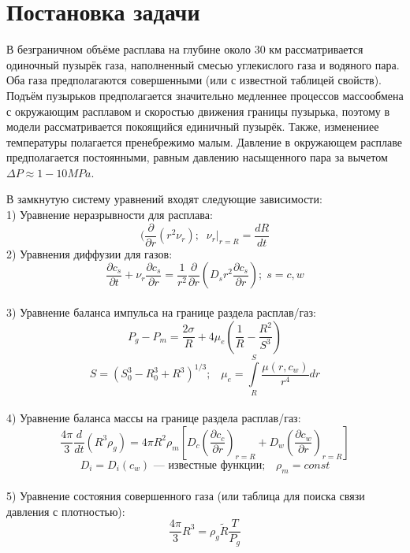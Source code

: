 \section{Постановка задачи}
\par В безграничном объёме расплава на глубине около 30 км рассматривается одиночный пузырёк газа, наполненный смесью углекислого газа и водяного пара. Оба газа предполагаются совершенными (или с известной таблицей свойств). Подъём пузырьков предполагается значительно медленнее процессов массообмена с окружающим расплавом и скоростью движения границы пузырька, поэтому в модели рассматривается покоящийся единичный пузырёк. Также, изменениее температуры полагается пренебрежимо малым. Давление в окружающем расплаве предполагается постоянными, равным давлению насыщенного пара за вычетом $\Delta P\approx 1-10 MPa$.\\
\par В замкнутую систему уравнений входят следующие зависимости:\\
1) Уравнение неразрывности для расплава:\\
$$(\frac{\partial}{\partial r}\left(r^{2}\nu_{r}\right);\;\; \left.\nu_{r}\right|_{r=R}=\frac{dR}{dt}$$
2) Уравнения диффузии для газов:\\
$$\frac{\partial c_{s}}{\partial t}+\nu_{r} \frac{\partial c_{s}}{\partial r}=\frac{1}{r^{2}}\frac{\partial}{\partial r}(D_{s}r^{2}\frac{\partial c_{s}}{\partial r});\; s=c, w$$\\
3) Уравнение баланса импульса на границе раздела расплав/газ:\\
$$P_{g}-P_{m}=\frac{2 \sigma}{R}+4\mu_{e}(\frac{1}{R}-\frac{R^{2}}{S^{3}})$$
$$S = (S_{0}^{3}-R_{0}^{3}+R^{3})^{1/3};\;\;\;\mu_{e}=\int\limits^{S}_{R}\frac{\mu(r,c_{w})}{r^{4}}dr$$\\
4) Уравнение баланса массы на границе раздела расплав/газ:\\
$$\frac{4\pi}{3}\frac{d}{dt}(R^3\rho_{g})=4\pi R^{2}\rho_{m}[D_{c}(\frac{\partial c_{c}}{\partial r})_{r=R}+D_{w}(\frac{\partial c_{w}}{\partial r})_{r=R}]$$
$$D_{i}=D_{i}(c_{w})\text{ --- известные функции};\;\;\;\rho_{m}=const$$\\
5) Уравнение состояния совершенного газа (или таблица для поиска связи давления с плотностью):\\
$$\frac{4\pi}{3}R^{3}=\rho_{g} \tilde{R}\frac{T}{P_{g}}$$